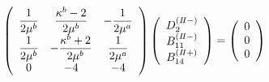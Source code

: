 \begin{align}
	\left(
	\begin{array}{ccc}
		{\displaystyle\frac{1}{2\mu^b}}& {\displaystyle\frac{\kappa^b-2}{2\mu^b}} & {\displaystyle-\frac{1}{2\mu^a}} \\
		{\displaystyle\frac{1}{2\mu^b}} & {\displaystyle-\frac{\kappa^b+2}{2\mu^b}} & {\displaystyle\frac{1}{2\mu^a}} \\
		0 & -4 & -4 \\
	\end{array}
	\right)
	\left(
	\begin{array}{c}
		D_{2}^{(I\hspace{-.15em}I-)} \\
	 	B_{11}^{(I\hspace{-.15em}I-)} \\
	 	B_{14}^{(I\hspace{-.15em}I+)} \\
	\end{array}
	\right)
	=
	\left(
	\begin{array}{c}
		0 \\
	 	0 \\
	 	0 \\
	\end{array}
	\right)
\end{align}
\newpage

